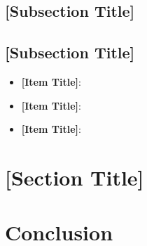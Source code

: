 \documentclass[a4paper,12pt]{article}
\begin{document}
\lipsum[14-15]

\subsection{{[Subsection Title]}}
\lipsum[16]

\subsection{{[Subsection Title]}}
\begin{itemize}[left=1em, itemsep=0pt, topsep=0pt] 
    \item \textbf{[Item Title]}: \lipsum[17][1-2]
    \item \textbf{[Item Title]}: \lipsum[17][3-4]
    \item \textbf{[Item Title]}: \lipsum[17][5-6]
\end{itemize}

\newpage

\section{{[Section Title]}}
\label{sec:section6}

\lipsum[18-19]

\begin{center}
\label{tab:example_table2}
\end{center}

\newpage 

\section{{Conclusion}} \label{sec:conclusion}

\lipsum[20]

\label{MyLastPage}
\end{document}
